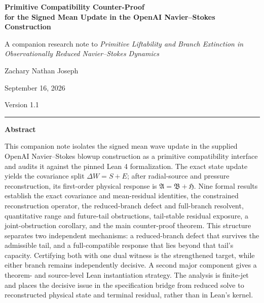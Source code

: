 \documentclass[12pt]{article}
\theoremstyle{plain}
\theoremstyle{definition}
\theoremstyle{remark}
\newcommand{\Comp}{\mathfrak A}
\newcommand{\Red}{\mathfrak B}
\newcommand{\Hidden}{\mathfrak H}
\begin{document}
\begin{titlepage}
\thispagestyle{empty}
\begin{center}
\vspace*{0.68in}
{\LARGE\bfseries Primitive Compatibility Counter-Proof\\[0.17in]
for the Signed Mean Update in the OpenAI Navier--Stokes Construction\par}
\vspace{0.25in}
{\large A companion research note to \emph{Primitive Liftability and Branch Extinction in Observationally Reduced Navier--Stokes Dynamics}\par}
\vspace{0.46in}
{\large Zachary Nathan Joseph\par}
\vspace{0.07in}
{\normalsize September 16, 2026\par}
\vspace{0.08in}
{\normalsize Version 1.1\par}
\vspace{0.40in}
\rule{0.82\textwidth}{0.4pt}
\end{center}

\vspace{0.26in}
\begin{center}
\begin{minipage}{0.88\textwidth}
\begin{center}
{\normalsize\bfseries Abstract}
\end{center}
\vspace{0.02in}
\small{}
This companion note isolates the signed mean wave update in the supplied OpenAI Navier--Stokes blowup construction as a primitive compatibility interface and audits it against the pinned Lean 4 formalization. The exact state update yields the covariance split \(\Delta W=S+E\); after radial-source and pressure reconstruction, its first-order physical response is \(\Comp=\Red+\Hidden\). Nine formal results establish the exact covariance and mean-residual identities, the constrained reconstruction operator, the reduced-branch defect and full-branch resolvent, quantitative range and future-tail obstructions, tail-stable residual exposure, a joint-obstruction corollary, and the main counter-proof theorem. This structure separates two independent mechanisms: a reduced-branch defect that survives the admissible tail, and a full-compatible response that lies beyond that tail's capacity. Certifying both with one dual witness is the strengthened target, while either branch remains independently decisive. A second major component gives a theorem- and source-level Lean instantiation strategy. The analysis is finite-jet and places the decisive issue in the specification bridge from reduced solve to reconstructed physical state and terminal residual, rather than in Lean's kernel.
\end{minipage}
\end{center}
\vfill
\end{titlepage}
\setcounter{page}{2}
\end{document}
